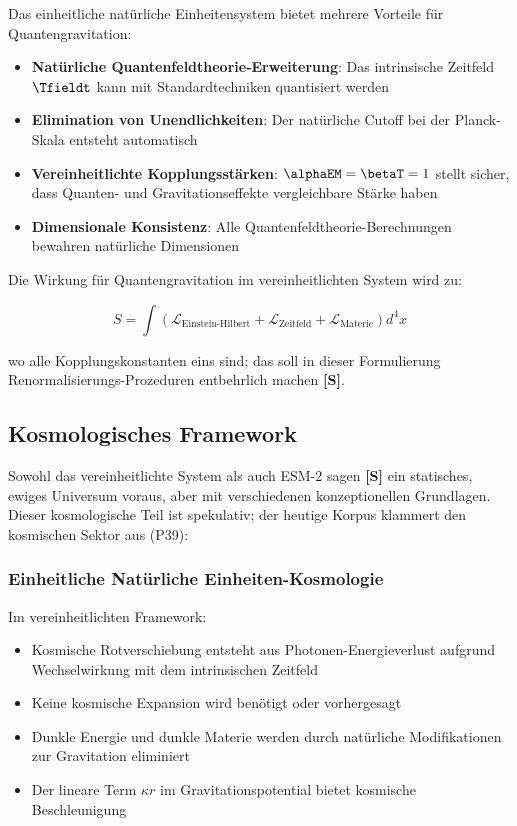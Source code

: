 	Das einheitliche natürliche Einheitensystem bietet mehrere Vorteile für Quantengravitation:
	
	\begin{itemize}
		\item \textbf{Natürliche Quantenfeldtheorie-Erweiterung}: Das intrinsische Zeitfeld $\Tfieldt$ kann mit Standardtechniken quantisiert werden
		\item \textbf{Elimination von Unendlichkeiten}: Der natürliche Cutoff bei der Planck-Skala entsteht automatisch
		\item \textbf{Vereinheitlichte Kopplungsstärken}: $\alphaEM = \betaT = 1$ stellt sicher, dass Quanten- und Gravitationseffekte vergleichbare Stärke haben
		\item \textbf{Dimensionale Konsistenz}: Alle Quantenfeldtheorie-Berechnungen bewahren natürliche Dimensionen
	\end{itemize}
	
	Die Wirkung für Quantengravitation im vereinheitlichten System wird zu:
	
	\begin{equation}
		S = \int \left( \mathcal{L}_{\text{Einstein-Hilbert}} + \mathcal{L}_{\text{Zeitfeld}} + \mathcal{L}_{\text{Materie}} \right) d^4x
	\end{equation}
	
	wo alle Kopplungskonstanten eins sind; das soll in dieser Formulierung Renormalisierungs-Prozeduren entbehrlich machen \textbf{[S]}.
	
	\subsection{Kosmologisches Framework}
	\label{subsec:cosmological_framework}
	
	Sowohl das vereinheitlichte System als auch ESM-2 sagen \textbf{[S]} ein statisches, ewiges Universum voraus, aber mit verschiedenen konzeptionellen Grundlagen. Dieser kosmologische Teil ist spekulativ; der heutige Korpus klammert den kosmischen Sektor aus (P39):
	
	\subsubsection{Einheitliche Natürliche Einheiten-Kosmologie}
	\label{subsubsec:unified_cosmology}
	
	Im vereinheitlichten Framework:
	\begin{itemize}
		\item Kosmische Rotverschiebung entsteht aus Photonen-Energieverlust aufgrund Wechselwirkung mit dem intrinsischen Zeitfeld
		\item Keine kosmische Expansion wird benötigt oder vorhergesagt
		\item Dunkle Energie und dunkle Materie werden durch natürliche Modifikationen zur Gravitation eliminiert
		\item Der lineare Term $\kappa r$ im Gravitationspotential bietet kosmische Beschleunigung
	\end{itemize}
	
